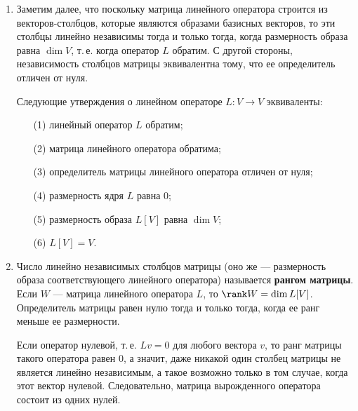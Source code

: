 \begin{enumerate}
\item Заметим далее, что поскольку матрица линейного оператора строится из векторов-столбцов, которые являются образами базисных векторов, то эти столбцы линейно независимы тогда и только тогда, когда размерность образа равна $\dim V$, т.\,е. когда оператор $L$ обратим. С другой стороны, независимость столбцов матрицы эквивалентна тому, что ее определитель отличен от нуля.
\begin{thrm} Следующие утверждения о линейном операторе $L:V\to V$ эквиваленты:
\begin{enumerate}[\textup{(1)}]
\item[\textup{(1)}] линейный оператор $L$ обратим;
\item[\textup{(2)}] матрица линейного оператора обратима;
\item[\textup{(3)}] определитель матрицы линейного оператора отличен от нуля;
\item[\textup{(4)}] размерность ядря $L$ равна 0;
\item[\textup{(5)}] размерность образа $L[V]$ равна $\dim V$;
\item[\textup{(6)}] $L[V]=V$.
\end{enumerate}
\end{thrm}
\item Число линейно независимых столбцов матрицы (оно же --- размерность образа соответствующего линейного оператора) называется \textbf{рангом матрицы}. Если $W$ --- матрица линейного оператора $L$, то $\rank W=\dim L[V]$. Определитель матрицы равен нулю тогда и только тогда, когда ее ранг меньше ее размерности.

Если оператор нулевой, т.\,е. $Lv=0$ для любого вектора $v$, то ранг матрицы такого оператора равен 0, а значит, даже никакой один столбец матрицы не является линейно независимым, а такое возможно только в том случае, когда этот вектор нулевой. Следовательно, матрица вырожденного оператора состоит из одних нулей.
\end{enumerate}

